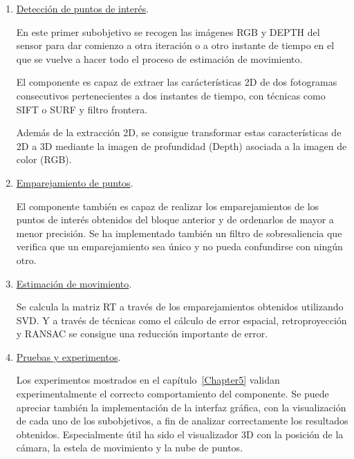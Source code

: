 \begin{enumerate}
 
\item \underline{Detección de puntos de interés}.

En este primer subobjetivo se recogen las imágenes RGB y DEPTH del sensor para dar comienzo a otra iteración o a otro instante de tiempo en el que se vuelve a hacer todo el proceso de estimación de movimiento.

El componente es capaz de extraer las carácterísticas 2D de dos fotogramas consecutivos pertenecientes a dos instantes de tiempo, con técnicas como SIFT o SURF y filtro frontera.

Además de la extracción 2D, se consigue transformar estas características de 2D a 3D mediante la imagen de profundidad (Depth) asociada a la imagen de color (RGB).

\item \underline{Emparejamiento de puntos}.

El componente también es capaz de realizar los emparejamientos de los puntos de interés obtenidos del bloque anterior y de ordenarlos de mayor a menor precisión. Se ha implementado también un filtro de sobresaliencia que verifica que un emparejamiento sea único y no pueda confundirse con ningún otro.

\item \underline{Estimación de movimiento}.

Se calcula la matriz RT a través de los emparejamientos obtenidos utilizando SVD. Y a través de técnicas como el cálculo de error espacial, retroproyección y RANSAC se consigue una reducción importante de error.

\item \underline{Pruebas y experimentos}.

Los experimentos mostrados en el capítulo~\ref{Chapter5} validan experimentalmente el correcto comportamiento del componente. Se puede apreciar también la implementación de la interfaz gráfica, con la visualización de cada uno de los subobjetivos, a fin de analizar correctamente los resultados obtenidos. Especialmente útil ha sido el visualizador 3D con la posición de la cámara, la estela de movimiento y la nube de puntos.

\end{enumerate}




